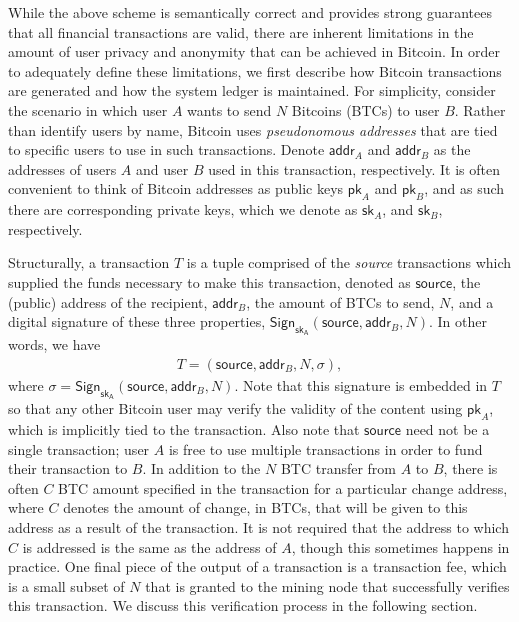 While the above scheme is semantically correct and provides strong guarantees that all financial transactions are valid, there are inherent limitations in the amount of user privacy and anonymity that can be achieved in Bitcoin. In order to adequately define these limitations, we first describe how Bitcoin transactions are generated and how the system ledger is maintained. For simplicity, consider the scenario in which user $A$ wants to send $N$ Bitcoins (BTCs) to user $B$. Rather than identify users by name, Bitcoin uses \emph{pseudonomous addresses} that are tied to specific users to use in such transactions. Denote $\mathsf{addr}_A$ and $\mathsf{addr}_B$ as the addresses of users $A$ and user $B$ used in this transaction, respectively. It is often convenient to think of Bitcoin addresses as public keys $\mathsf{pk}_A$ and $\mathsf{pk}_B$, and as such there are corresponding private keys, which we denote as $\mathsf{sk}_A$, and $\mathsf{sk}_B$, respectively.

Structurally, a transaction $T$ is a tuple comprised of the \emph{source} transactions which supplied the funds necessary to make this transaction, denoted as $\mathsf{source}$, the (public) address of the recipient, $\mathsf{addr}_B$, the amount of BTCs to send, $N$, and a digital signature of these three properties, $\mathsf{Sign}_{\mathsf{sk_A}}({\mathsf{source}, \mathsf{addr}_B, N})$. In other words, we have 
\begin{align*}
T = (\mathsf{source}, \mathsf{addr}_B, N, \sigma), 
\end{align*}
where $\sigma = \mathsf{Sign}_{\mathsf{sk_A}}({\mathsf{source}, \mathsf{addr}_B, N})$. Note that this signature is embedded in $T$ so that any other Bitcoin user may verify the validity of the content using $\mathsf{pk}_A$, which is implicitly tied to the transaction. Also note that $\mathsf{source}$ need not be a single transaction; user $A$ is free to use multiple transactions in order to fund their transaction to $B$. In addition to the $N$ BTC transfer from $A$ to $B$, there is often $C$ BTC amount specified in the transaction for a particular change address, where $C$ denotes the amount of change, in BTCs, that will be given to this address as a result of the transaction. It is not required that the address to which $C$ is addressed is the same as the address of $A$, though this sometimes happens in practice. One final piece of the output of a transaction is a transaction fee, which is a small subset of $N$ that is granted to the mining node that successfully verifies this transaction. We discuss this verification process in the following section.

